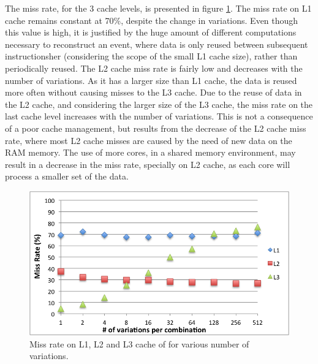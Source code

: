 The miss rate, for the 3 cache levels, is presented in figure \ref{fig:MissRate}. The miss rate on L1 cache remains constant at 70\%, despite the change in variations. Even though this value is high, it is justified by the huge amount of different computations necessary to reconstruct an event, where data is only reused between subsequent instructionsher (considering the scope of the small L1 cache size), rather than periodically reused. The L2 cache miss rate is fairly low and decreases with the number of variations. As it has a larger size than L1 cache, the data is reused more often without causing misses to the L3 cache. Due to the reuse of data in the L2 cache, and considering the larger size of the L3 cache, the miss rate on the last cache level increases with the number of variations. This is not a consequence of a poor cache management, but results from the decrease of the L2 cache miss rate, where most L2 cache misses are caused by the need of new data on the RAM memory. The use of more cores, in a shared memory environment, may result in a decrease in the miss rate, specially on L2 cache, as each core will process a smaller set of the data.

\begin{figure}[!htp]
	\begin{center}
		\includegraphics[scale=0.8]{../../common/graphs/miss_rate.png}  
		\caption{Miss rate on L1, L2 and L3 cache of \ttDilepKinFit for various number of variations.}
		\label{fig:MissRate}
	\end{center}
\end{figure}

